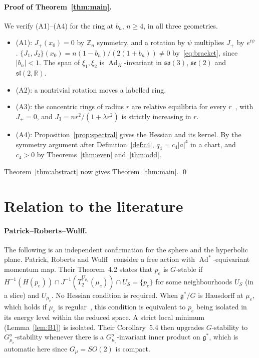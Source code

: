 \documentclass[11pt]{article}
\theoremstyle{definition}
\theoremstyle{remark}
\newcommand{\R}{\mathbb{R}}
\newcommand{\Z}{\mathbb{Z}}
\begin{document}
\paragraph{Proof of Theorem~\ref{thm:main}.} We verify (A1)--(A4) for the ring at $b_n$, $n\ge4$, in all
three geometries.
\begin{itemize}
\item (A1): $J_+(x_0)=0$ by $\Z_n$ symmetry, and a rotation by $\psi$ multiplies $J_+$ by $e^{i\psi}$.
$\{J_1,J_2\}(x_0)=n(1-b_n)/(2(1+b_n))\ne0$ by~\eqref{eq:bracket}, since $|b_n|<1$. The span of
$\xi_1,\xi_2$ is $\operatorname{Ad}_K$-invariant in $\mathfrak{so}(3)$, $\mathfrak{se}(2)$ and
$\mathfrak{sl}(2,\R)$.
\item (A2): a nontrivial rotation moves a labelled ring.
\item (A3): the concentric rings of radius $r$ are relative equilibria for every $r$~\cite[(2.1)]{MT}, with
$J_+=0$, and $J_3=nr^2/(1+\lambda r^2)$ is strictly increasing in $r$.
\item (A4): Proposition~\ref{prop:spectral} gives the Hessian and its kernel. By the symmetry argument after
Definition~\ref{def:c4}, $q_4=c_4|a|^4$ in a chart, and $c_4>0$ by Theorems~\ref{thm:even}
and~\ref{thm:odd}.
\end{itemize}
Theorem~\ref{thm:abstract} now gives Theorem~\ref{thm:main}. \qed

\section{Relation to the literature}\label{sec:lit}

\paragraph{Patrick--Roberts--Wulff.} The following is an independent confirmation for the sphere and the
hyperbolic plane. Patrick, Roberts and Wulff~\cite{PRW} consider a free action with
$\operatorname{Ad}^*$-equivariant momentum map. Their Theorem~4.2 states that $p_e$ is $G$-stable if
$H^{-1}(H(p_e))\cap J^{-1}(T_2^{U_{\mu_e}}(\mu_e))\cap U_S=\{p_e\}$ for some neighbourhoods $U_S$ (in a slice)
and $U_{\mu_e}$. No Hessian condition is required. When $\mathfrak g^*/G$ is Hausdorff at $\mu_e$, which
holds if $\mu_e$ is regular~\cite[Prop.~4.10(1)]{PRW}, this condition is equivalent to $p_e$ being isolated
in its energy level within the reduced space. A strict local minimum (Lemma~\ref{lem:B1}) is isolated.
Their Corollary~5.4 then upgrades $G$-stability to $G^o_{\mu_e}$-stability whenever there is a
$G^o_{\mu_e}$-invariant inner product on $\mathfrak g^*$, which is automatic here since $G_\mu=SO(2)$ is
compact.
\end{document}

